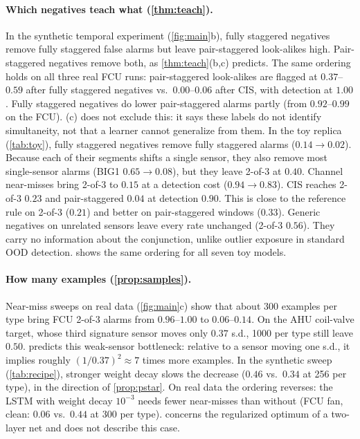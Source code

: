 \documentclass{article}
\theoremstyle{definition}
\theoremstyle{remark}
\renewcommand{\1}{\mathbf{1}}
\begin{document}
\paragraph{Which negatives teach what (\cref{thm:teach}).} In the synthetic temporal experiment (\cref{fig:main}b), fully staggered negatives remove fully staggered false alarms but leave pair-staggered look-alikes high. Pair-staggered negatives remove both, as \cref{thm:teach}(b,c) predicts. The same ordering holds on all three real FCU runs: pair-staggered look-alikes are flagged at $0.37$--$0.59$ after fully staggered negatives vs.\ $0.00$--$0.06$ after CIS, with detection at $1.00$. Fully staggered negatives do lower pair-staggered alarms partly (from $0.92$--$0.99$ on the FCU). (c) does not exclude this: it says these labels do not identify simultaneity, not that a learner cannot generalize from them. In the toy replica (\cref{tab:toy}), fully staggered negatives remove fully staggered alarms ($0.14\to0.02$). Because each of their segments shifts a single sensor, they also remove most single-sensor alarms (BIG1 $0.65\to0.08$), but they leave 2-of-3 at $0.40$. Channel near-misses bring 2-of-3 to $0.15$ at a detection cost ($0.94\to0.83$). CIS reaches 2-of-3 $0.23$ and pair-staggered $0.04$ at detection $0.90$. This is close to the reference rule on 2-of-3 ($0.21$) and better on pair-staggered windows ($0.33$). Generic negatives on unrelated sensors leave every rate unchanged (2-of-3 $0.56$). They carry no information about the conjunction, unlike outlier exposure in standard OOD detection.  shows the same ordering for all seven toy models.

\paragraph{How many examples (\cref{prop:samples}).} Near-miss sweeps on real data (\cref{fig:main}c) show that about 300 examples per type bring FCU 2-of-3 alarms from $0.96$--$1.00$ to $0.06$--$0.14$. On the AHU coil-valve target, whose third signature sensor moves only $0.37$ s.d., 1000 per type still leave $0.50$.  predicts this weak-sensor bottleneck: relative to a sensor moving one s.d., it implies roughly $(1/0.37)^2\approx7$ times more examples. In the synthetic sweep (\cref{tab:recipe}), stronger weight decay slows the decrease ($0.46$ vs.\ $0.34$ at 256 per type), in the direction of \cref{prop:pstar}. On real data the ordering reverses: the LSTM with weight decay $10^{-3}$ needs fewer near-misses than without (FCU fan, clean: $0.06$ vs.\ $0.44$ at 300 per type).  concerns the regularized optimum of a two-layer net and does not describe this case.
\end{document}
